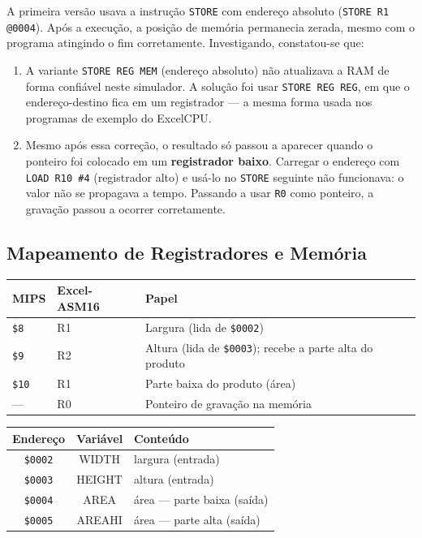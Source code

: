 \documentclass[12pt, a4paper]{article}
\begin{document}
A primeira versão usava a instrução \texttt{STORE} com endereço absoluto (\texttt{STORE R1 @0004}). Após a execução, a posição de memória permanecia zerada, mesmo com o programa atingindo o fim corretamente. Investigando, constatou-se que:

\begin{enumerate}[itemsep=4pt]
  \item A variante \texttt{STORE REG MEM} (endereço absoluto) não atualizava a RAM de forma confiável neste simulador. A solução foi usar \texttt{STORE REG REG}, em que o endereço-destino fica em um registrador --- a mesma forma usada nos programas de exemplo do ExcelCPU.
  \item Mesmo após essa correção, o resultado só passou a aparecer quando o ponteiro foi colocado em um \textbf{registrador baixo}. Carregar o endereço com \texttt{LOAD R10 \#4} (registrador alto) e usá-lo no \texttt{STORE} seguinte não funcionava: o valor não se propagava a tempo. Passando a usar \texttt{R0} como ponteiro, a gravação passou a ocorrer corretamente.
\end{enumerate}

\subsection{Mapeamento de Registradores e Memória}

\begin{table}[h!]
\centering
\begin{tabularx}{\textwidth}{llX}
  \toprule
  \textbf{MIPS} & \textbf{Excel-ASM16} & \textbf{Papel} \\
  \midrule
  \texttt{\$8} & R1 & Largura (lida de \texttt{\$0002}) \\
  \texttt{\$9} & R2 & Altura (lida de \texttt{\$0003}); recebe a parte alta do produto \\
  \texttt{\$10} & R1 & Parte baixa do produto (área) \\
  --- & R0 & Ponteiro de gravação na memória \\
  \bottomrule
\end{tabularx}
\end{table}

\begin{table}[h!]
\centering
\begin{tabular}{ccl}
  \toprule
  \textbf{Endereço} & \textbf{Variável} & \textbf{Conteúdo} \\
  \midrule
  \texttt{\$0002} & WIDTH  & largura (entrada) \\
  \texttt{\$0003} & HEIGHT & altura (entrada) \\
  \texttt{\$0004} & AREA   & área --- parte baixa (saída) \\
  \texttt{\$0005} & AREAHI & área --- parte alta (saída) \\
  \bottomrule
\end{tabular}
\end{table}
\end{document}
